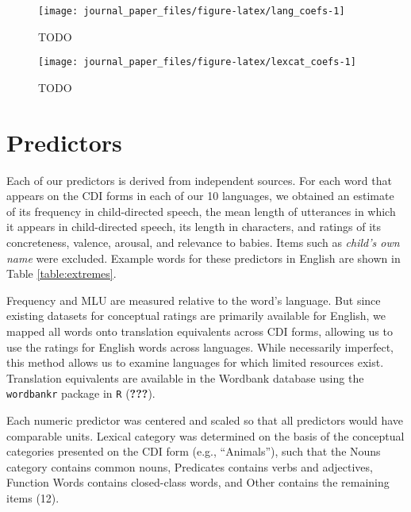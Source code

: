 \documentclass[9pt,twocolumn,twoside]{pnas-new}
\begin{document}
\begin{figure*}

{\centering \texttt{[image: journal\_paper\_files/figure-latex/lang\_coefs-1]} 

}

\caption{TODO}\label{fig:lang_coefs}
\end{figure*}

\begin{figure*}

{\centering \texttt{[image: journal\_paper\_files/figure-latex/lexcat\_coefs-1]} 

}

\caption{TODO}\label{fig:lexcat_coefs}
\end{figure*}

\section*{Predictors}\label{predictors}

Each of our predictors is derived from independent sources. For each
word that appears on the CDI forms in each of our 10 languages, we
obtained an estimate of its frequency in child-directed speech, the mean
length of utterances in which it appears in child-directed speech, its
length in characters, and ratings of its concreteness, valence, arousal,
and relevance to babies. Items such as \emph{child's own name} were
excluded. Example words for these predictors in English are shown in
Table \ref{table:extremes}.

Frequency and MLU are measured relative to the word's language. But
since existing datasets for conceptual ratings are primarily available
for English, we mapped all words onto translation equivalents across CDI
forms, allowing us to use the ratings for English words across
languages. While necessarily imperfect, this method allows us to examine
languages for which limited resources exist. Translation equivalents are
available in the Wordbank database using the \texttt{wordbankr} package
in \texttt{R} (\textbf{???}).

Each numeric predictor was centered and scaled so that all predictors
would have comparable units. Lexical category was determined on the
basis of the conceptual categories presented on the CDI form (e.g.,
``Animals''), such that the Nouns category contains common nouns,
Predicates contains verbs and adjectives, Function Words contains
closed-class words, and Other contains the remaining items (12).
\end{document}

